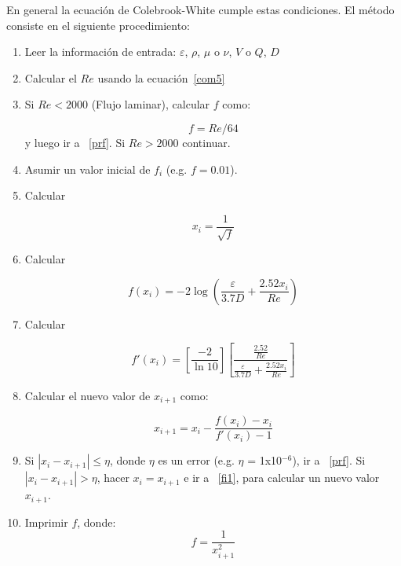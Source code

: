 \documentclass[11pt, oneside]{article}
\begin{document}
En general la ecuaci\'on de Colebrook-White cumple estas condiciones. El m\'etodo consiste en el siguiente procedimiento:

\begin{enumerate} 
\item Leer la informaci\'on de entrada: $\varepsilon$, $\rho$, $\mu$ o $\nu$, $V$ o $Q$, $D$ 
\item Calcular el $Re$ usando la ecuaci\'on~\ref{com5}
\item Si $Re<2000$ (Flujo laminar), calcular $f$ como:

\begin{equation}
f=Re/64 
\label{com7a}
\end{equation}
y luego ir a ~\ref{prf}. Si $Re > 2000$ continuar.

\item Asumir un valor inicial de $f_i$ (e.g. $f=0.01$).
\item Calcular 

\begin{equation}
x_i = \frac{1}{\sqrt{f}}
\label{com9}
\end{equation}

\item \label{fi1} Calcular 

\begin{equation}
f(x_i ) =  -2 \log \left( \frac{\varepsilon}{3.7D} + \frac{2.52 x_i }{Re} \right)
\label{com10}
\end{equation}

\item Calcular 

\begin{equation}
f' (x_i ) =\left[\frac{-2}{\ln 10} \right] \left[ \frac{\frac{2.52}{Re}}{\frac{\varepsilon}{3.7D}+\frac{2.52 x_i }{Re}}\right] 
\label{com11}
\end{equation}

\item Calcular el nuevo valor de $x_{i+1}$ como:

\begin{equation}
 x_{i+1} = x_{i} - \frac{f(x_i ) - x_i}{f'(x_i ) -1} 
\label{com12}
\end{equation}

\item Si $|x_{i}- x_{i+1}| \leq \eta$, donde $\eta$ es un error  (e.g. $\eta$ = 1x10$^{-6}$), ir a ~\ref{prf}. Si $|x_{i}- x_{i+1}| > \eta$, hacer $x_i = x_{i+1}$ e ir a ~\ref{fi1},  para  calcular un nuevo valor $x_{i+1}$.

\item \label{prf} Imprimir $f$, donde:
\begin{equation}
f = \frac{1}{x_{i+1}^2}
\label{com12}
\end{equation}

\end{enumerate} 
\end{document}
